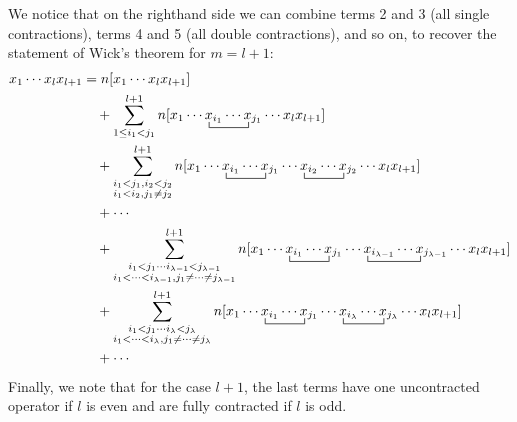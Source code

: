 \documentclass{article}
\newcommand{\ctr}{\bcontraction}
\newcommand{\cd}{\ensuremath{\cdots} }
\begin{document}
We notice that on the righthand side we can combine terms 2 and 3 (all single contractions), terms 4 and 5 (all double contractions), and so on, to 
recover the statement of Wick's theorem for $m = l+1$: 
\begin{align*}
x_1 \cd x_l x_{l + 1} 
&= n[x_1 \cd x_l x_{l + 1}  ]  \\
& \quad + \sum_{1 \leq i_1 <  j_1}^{l+1} n[x_1 \cd \ctr{}{x}{{}_{i_1}\cd}{x} x_{i_1}  \cd x_{j_1}  \cd x_l x_{l + 1} ]   \\
& \quad +   \sum_{\substack{i_1 < j_1,  i_2 < j_2 \\ i_1 < i_2, j_1 \neq j_2}}^{l+1}
n[x_1 \cd \ctr{}{x}{{}_{i_1}\cd}{x} x_{i_1}  \cd x_{j_1} \cd \ctr{}{x}{{}_{i_2}\cd}{x} x_{i_2}  \cd x_{j_2} \cd x_l x_{l + 1}  ] \\
 & \quad  +  \cd \\
& \quad +  \sum_{\substack{i_1 <  j_1 \cd  i_{\lambda - 1} < j_{\lambda - 1} \\ i_1 < \cd < i_{\lambda - 1}, j_1 \neq \cd \neq j_{\lambda-1}}}^{l+1}
n[x_1 \cd \ctr{}{x}{{}_{i_1}\cd}{x} x_{i_1}  \cd x_{j_1} \cd \ctr{}{x}{{}_{i_{\lambda -1} }\cd}{x} x_{i_{\lambda-1}}  \cd x_{j_{\lambda - 1}} \cd x_l  x_{l + 1}]   \\
& \quad +  \sum_{\substack{i_1 <  j_1 \cd  i_\lambda < j_\lambda \\ i_1 < \cd < i_\lambda, j_1 \neq \cd \neq j_\lambda}}^{l+1} 
n[x_1 \cd \ctr{}{x}{{}_{i_1}\cd}{x} x_{i_1}  \cd x_{j_1} \cd \ctr{}{x}{{}_{i_\lambda}\cd}{x} x_{i_\lambda}  \cd x_{j_\lambda} \cd x_l x_{l + 1} ] \\
& \quad + \cd
\end{align*}
Finally, we note that for the case $l+1$,
the last terms have one uncontracted operator if $l$ is even and are fully contracted if $l$ is odd. 
\end{document}
